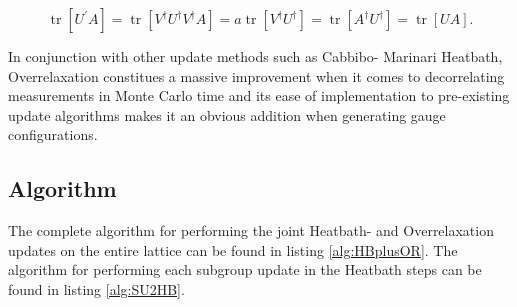 \documentclass[a4paper,10pt]{book}
\begin{document}
\begin{equation}
\operatorname{tr}\left[U^{\prime} A\right]=\operatorname{tr}\left[V^{\dagger} U^{\dagger} V^{\dagger} A\right]=a \operatorname{tr}\left[V^{\dagger} U^{\dagger}\right]=\operatorname{tr}\left[A^{\dagger} U^{\dagger}\right]=\operatorname{tr}[U A].
\end{equation}

In conjunction with other update methods such as Cabbibo- Marinari Heatbath, Overrelaxation constitues a massive improvement when it comes to decorrelating measurements in Monte Carlo time \cite{PhysRevLett.58.2394} and its ease of implementation to pre-existing update algorithms makes it an obvious addition when generating gauge configurations.

\subsection{Algorithm}
The complete algorithm for performing the joint Heatbath- and Overrelaxation updates on the entire lattice can be found in listing \ref{alg:HBplusOR}. The algorithm for performing each subgroup update in the Heatbath steps can be found in listing \ref{alg:SU2HB}.
\end{document}
